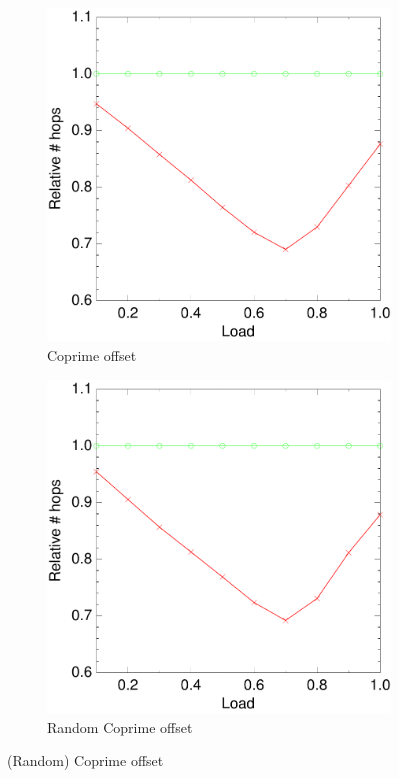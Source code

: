 \documentclass[10pt,a4paper]{article}
\begin{document}
\begin{figure}[h!tb]
        \begin{subfigure}[b]{0.5\textwidth}
                \centering
                \includegraphics[width=\textwidth]{data/primeright.pdf}
                \caption{Coprime offset}
        \end{subfigure}
        \begin{subfigure}[b]{0.5\textwidth}
                \centering
                \includegraphics[width=\textwidth]{data/randprimeright.pdf}
                \caption{Random Coprime offset}
        \end{subfigure}
\caption{(Random) Coprime offset}
\label{figprimes}
\end{figure}
\end{document}
